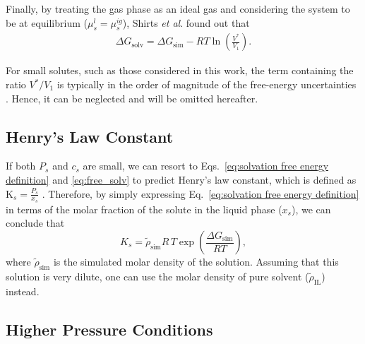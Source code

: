 \documentclass[3p,twocolumn]{elsarticle}
\providecommand{\DIFadd}[1]{{\protect\color{blue}\uwave{#1}}} %
\providecommand{\DIFdel}[1]{{\protect\color{red}\sout{#1}}}                      %
\providecommand{\DIFaddbegin}{} %
\providecommand{\DIFaddend}{} %
\providecommand{\DIFdelbegin}{} %
\providecommand{\DIFdelend}{} %
\newcommand{\DIFscaledelfig}{0.5}
\newlength{\DIFdelgraphicswidth} %
\newlength{\DIFdelgraphicsheight} %
\newcommand{\DIFaddincludegraphics}[2][]{{\color{blue}\fbox{\DIFOincludegraphics[#1]{#2}}}} %
\newcommand{\DIFdelincludegraphics}[2][]{%
\sbox{\DIFdelgraphicsbox}{\DIFOincludegraphics[#1]{#2}}%
\settoboxwidth{\DIFdelgraphicswidth}{\DIFdelgraphicsbox} %
\settoboxtotalheight{\DIFdelgraphicsheight}{\DIFdelgraphicsbox} %
\scalebox{\DIFscaledelfig}{%
\parbox[b]{\DIFdelgraphicswidth}{\usebox{\DIFdelgraphicsbox}\\[-\baselineskip] \rule{\DIFdelgraphicswidth}{0em}}\llap{\resizebox{\DIFdelgraphicswidth}{\DIFdelgraphicsheight}{%
\setlength{\unitlength}{\DIFdelgraphicswidth}%
\begin{picture}(1,1)%
\thicklines\linethickness{2pt} %
{\color[rgb]{1,0,0}\put(0,0){\framebox(1,1){}}}%
{\color[rgb]{1,0,0}\put(0,0){\line( 1,1){1}}}%
{\color[rgb]{1,0,0}\put(0,1){\line(1,-1){1}}}%
\end{picture}%
}\hspace*{3pt}}} %
} %
\DeclareRobustCommand{\DIFaddbegin}{\DIFOaddbegin \let\includegraphics\DIFaddincludegraphics} %
\DeclareRobustCommand{\DIFaddend}{\DIFOaddend \let\includegraphics\DIFOincludegraphics} %
\DeclareRobustCommand{\DIFdelbegin}{\DIFOdelbegin \let\includegraphics\DIFdelincludegraphics} %
\DeclareRobustCommand{\DIFdelend}{\DIFOaddend \let\includegraphics\DIFOincludegraphics} %
\begin{document}
Finally, by treating the gas phase as an ideal gas and considering the system to be at equilibrium ($\mu^l_s = \mu^{ig}_s$), Shirts \textit{et al}. \cite{Shirts_2003} found out that
\begin{equation}
\begin{split}
\label{eq:free_solv}
 \Delta G_{\text{solv}} = \Delta G_\text{sim} - RT \ln \left( \frac{V^{\ast}}{V_1}\right).
\end{split}
\end{equation}

For small solutes, such as those considered in this work, the term containing the ratio $V^{\ast}/V_1$ is typically in the order of magnitude of the free-energy uncertainties \cite{Shirts_2003}.
Hence, it can be neglected and will be omitted hereafter.

\subsection*{Henry's Law Constant}

If both \DIFdelbegin \DIFdel{$P_s$ }\DIFdelend \DIFaddbegin \DIFadd{$p_s$ }\DIFaddend and $c_s$ are small, we can resort to Eqs.~\eqref{eq:solvation free energy definition} and \eqref{eq:free_solv} to predict Henry's law constant, which is defined as \DIFdelbegin \DIFdel{$\text{K}_s =\frac{P_s}{x_s}$ }\DIFdelend \DIFaddbegin \DIFadd{$\text{K}_s =\frac{p_s}{x_s}$ }\DIFaddend \cite{Prausnitz}.
%
Therefore, by simply expressing Eq.~\eqref{eq:solvation free energy definition} in terms of the molar fraction of the solute in the liquid phase ($x_s$), we can conclude that
\begin{equation}
\label{eq:henry_eq}
K_s = \tilde{\rho}_\text{sim} R \, T \exp\left(\frac{\Delta G_\text{sim}}{R T}\right),
\end{equation}
where $\tilde{\rho}_\text{sim}$ is the simulated molar density of the solution. Assuming that this solution is very dilute, one can use the molar density of pure solvent ($\tilde{\rho}_\text{IL}$) instead.

\subsection*{Higher Pressure Conditions}
\label{sec:partial_pressure}
\end{document}
